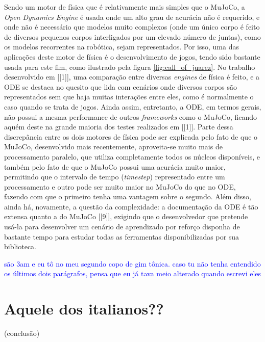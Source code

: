 \documentclass[cic,tc]{iiufrgs}
\newcommand\henrique[1]{\textcolor{blue}{#1}}
\begin{document}
Sendo um motor de física que é relativamente mais simples que o MuJoCo, a
\textit{Open Dynamics Engine} é usada onde um alto grau de acurácia não é
requerido, e onde não é necessário que modelos muito complexos (onde um único
corpo é feito de diversos pequenos corpos interligados por um elevado número de
juntas), como os modelos recorrentes na robótica, sejam representados. Por isso,
uma das aplicações deste motor de física é o desenvolvimento de jogos, tendo
sido bastante usada para este fim, como ilustrado pela figura
\ref{fig:call_of_juarez}. No trabalho desenvolvido em [[1]], uma comparação
entre diversas \textit{engines} de física é feito, e a ODE se destaca no quesito
que lida com cenários onde diversos corpos são representados sem que haja
muitas interações entre eles, como é normalmente o caso quando se trata de
jogos. Ainda assim, entretanto, a ODE, em termos gerais, não possui a mesma
performance de outros \textit{frameworks} como o MuJoCo, ficando aquém deste na
grande maioria dos testes realizados em [[1]]. Parte dessa discrepância entre os
dois motores de física pode ser explicada pelo fato de que o MuJoCo,
desenvolvido mais recentemente, aproveita-se muito mais de processamento
paralelo, que utiliza completamente todos os núcleos disponíveis, e também pelo
fato de que o MuJoCo possui uma acurácia muito maior, permitindo que o intervalo
de tempo (\textit{timestep}) representado entre um processamento e outro pode
ser muito maior no MuJoCo do que no ODE, fazendo com que o primeiro tenha uma
vantagem sobre o segundo. Além disso, ainda há, novamente, a questão da
complexidade: a documentação da ODE é tão extensa quanto a do MuJoCo [[9]],
exigindo que o desenvolvedor que pretende usá-la para desenvolver um cenário de
aprendizado por reforço disponha de bastante tempo para estudar todas as
ferramentas disponibilizadas por sua biblioteca.

\henrique{são 3am e eu tô no meu segundo copo de gim tônica. caso tu não tenha
entendido os últimos dois parágrafos, pensa que eu já tava meio alterado quando
escrevi eles}

\section{Aquele dos italianos??}
\blindtext


(conclusão) \blindtext
\end{document}
